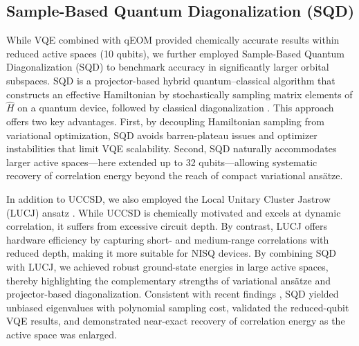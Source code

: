 \documentclass[num-refs]{wiley-article}
\begin{document}

\subsection{Sample-Based Quantum Diagonalization (SQD)}

While VQE combined with qEOM provided chemically accurate results within reduced active spaces (10 qubits), we further employed Sample-Based Quantum Diagonalization (SQD)\cite{robledo2025chemistry,nakagawa2024adapt,kanno2023quantum,barison2025quantum} to benchmark accuracy in significantly larger orbital subspaces. SQD is a projector-based hybrid quantum--classical algorithm that constructs an effective Hamiltonian by stochastically sampling matrix elements of $\hat{H}$ on a quantum device, followed by classical diagonalization \cite{huggins2022unbiasing,lee2022unbiasing}. This approach offers two key advantages. First, by decoupling Hamiltonian sampling from variational optimization, SQD avoids barren-plateau issues and optimizer instabilities that limit VQE scalability. Second, SQD naturally accommodates larger active spaces---here extended up to 32 qubits---allowing systematic recovery of correlation energy beyond the reach of compact variational ans\"atze.  

In addition to UCCSD, we also employed the Local Unitary Cluster Jastrow (LUCJ) ansatz \cite{motta2020quantum}. While UCCSD is chemically motivated and excels at dynamic correlation, it suffers from excessive circuit depth. By contrast, LUCJ offers hardware efficiency by capturing short- and medium-range correlations with reduced depth, making it more suitable for NISQ devices. By combining SQD with LUCJ, we achieved robust ground-state energies in large active spaces, thereby highlighting the complementary strengths of variational ans\"atze and projector-based diagonalization. Consistent with recent findings \cite{kaliakin2025implicit}, SQD yielded unbiased eigenvalues with polynomial sampling cost, validated the reduced-qubit VQE results, and demonstrated near-exact recovery of correlation energy as the active space was enlarged.  
\end{document}
